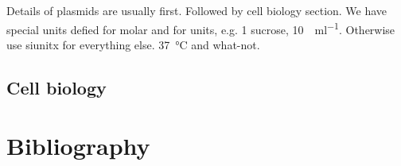 Details of plasmids are usually first.
Followed by cell biology section.
We have special units defied for molar and for units, e.g. \SI{1}{\Molar} sucrose, \SI{10}{\Units\per\milli\litre}.
Otherwise use siunitx for everything else. \SI{37}{\degreeCelsius} and what-not.

\subsection*{Cell biology}

\lipsum[80]

\section*{Bibliography}


